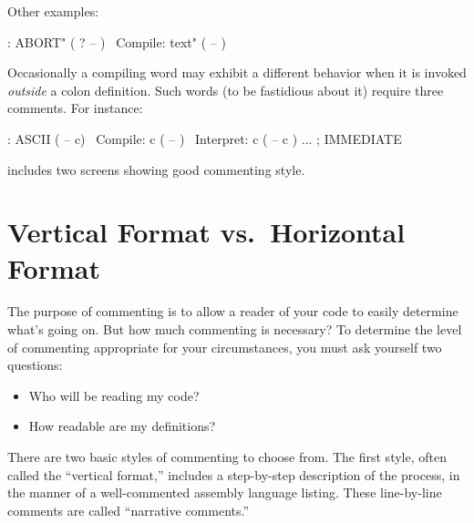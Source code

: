 Other examples:
\begin{Code}
: ABORT"  ( ? -- )
\ Compile:   text"   ( -- )
\end{Code}
Occasionally a compiling word may exhibit a different behavior when it
is invoked \emph{outside} a colon definition.  Such words (to be
fastidious about it) require three comments.  For instance:
\begin{Code}
: ASCII  ( -- c)
\ Compile:   c   ( -- )
\ Interpret:   c   ( -- c )
     ... ; IMMEDIATE
\end{Code}
 includes two screens showing good commenting style.%
%
%

\section{Vertical Format vs.\ Horizontal Format}%
%
The purpose of commenting is to allow a reader of your code to easily
determine what's going on.  But how much commenting is necessary? To
determine the level of commenting appropriate for your circumstances,
you must ask yourself two questions:

\begin{itemize}
\expandafter\item\ifeightyfour[]\fi Who will be reading my code?
\expandafter\item\ifeightyfour[]\fi How readable are my definitions?
\end{itemize}%
There are two basic styles of commenting to choose from.  The first
style, often called the ``vertical format,'' includes a step-by-step
description of the process, in the manner of a well-commented assembly
language listing.  These line-by-line comments are called ``narrative
comments.''

